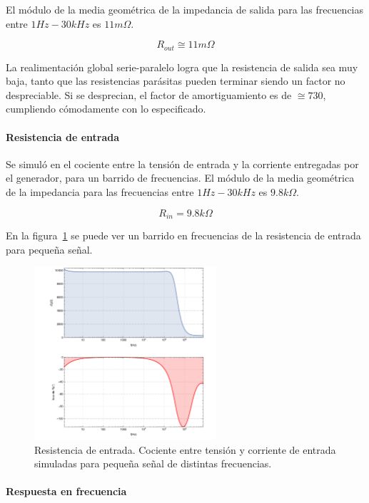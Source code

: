 \documentclass[a4paper,12pt,twoside]{article}
\begin{document}
El módulo de la media geométrica de la impedancia de salida para las frecuencias entre $1Hz-30kHz$ es $11m\Omega$.

\[R_{out}\cong 11m\Omega\]

La realimentación global serie-paralelo logra que la resistencia de salida sea muy baja, tanto que las resistencias parásitas pueden terminar siendo un factor no despreciable. Si se desprecian, el factor de amortiguamiento es de $\cong 730$, cumpliendo cómodamente con lo especificado.


\paragraph{Resistencia de entrada}

Se simuló en el cociente entre la tensión de entrada y la corriente entregadas por el generador, para un barrido de frecuencias. El módulo de la media geométrica de la impedancia para las frecuencias entre $1Hz-30kHz$ es $9.8k\Omega$.

\[R_{in}=9.8k\Omega\]

En la figura~\ref{fig:R_i} se puede ver un barrido en frecuencias de la resistencia de entrada para pequeña señal.


\begin{figure}[H]
	\centering
	\includegraphics[width=0.6\textwidth]{img/sim/R_i}
	\caption{Resistencia de entrada. Cociente entre tensión y corriente de entrada simuladas para pequeña señal de distintas frecuencias.}
	\label{fig:R_i}
\end{figure}



\paragraph{Respuesta en frecuencia} 
\end{document}

